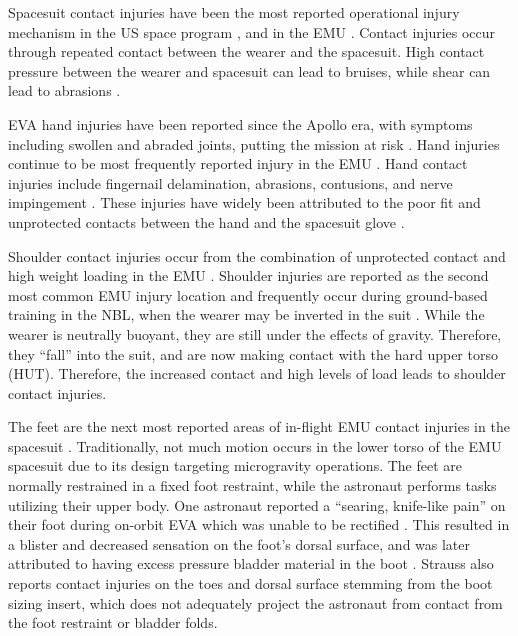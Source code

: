 \documentclass[defaultstyle,11pt]{comps}
\begin{document}
Spacesuit contact injuries have been the most reported operational injury mechanism in the US space program \citep{Scheuring2008}, and in the EMU \citep{Strauss2004, Viegas2004, Scheuring2012}.
Contact injuries occur through repeated contact between the wearer and the spacesuit.
High contact pressure between the wearer and spacesuit can lead to bruises, while shear can lead to abrasions \citep{Mailler2004, Carlson2006}.

EVA hand injuries have been reported since the Apollo era, with symptoms including swollen and abraded joints, putting the mission at risk \citep{Scheuring2012}.
Hand injuries continue to be most frequently reported injury in the EMU \citep{Strauss2004, Viegas2004, Scheuring2012}.
Hand contact injuries include fingernail delamination, abrasions, contusions, and nerve impingement \citep{Strauss2004, Viegas2004, Scheuring2012}.
These injuries have widely been attributed to the poor fit and unprotected contacts between the hand and the spacesuit glove \citep{Strauss2004, Viegas2004}.

Shoulder contact injuries occur from the combination of unprotected contact and high weight loading in the EMU \citep{Strauss2004, Viegas2004}.
Shoulder injuries are reported as the second most common EMU injury location and frequently occur during ground-based training in the NBL, when the wearer may be inverted in the suit \citep{Strauss2004, Viegas2004}.
While the wearer is neutrally buoyant, they are still under the effects of gravity.
Therefore, they ``fall'' into the suit, and are now making contact with the hard upper torso (HUT).
Therefore, the increased contact and high levels of load leads to shoulder contact injuries.

The feet are the next most reported areas of in-flight EMU contact injuries in the spacesuit \citep{Scheuring2012}.
Traditionally, not much motion occurs in the lower torso of the EMU spacesuit due to its design targeting microgravity operations.
The feet are normally restrained in a fixed foot restraint, while the astronaut performs tasks utilizing their upper body.
One astronaut reported a ``searing, knife-like pain'' on their foot during on-orbit EVA which was unable to be rectified \citep{Scheuring2012}.
This resulted in a blister and decreased sensation on the foot's dorsal surface, and was later attributed to having excess pressure bladder material in the boot \citep{Scheuring2012}.
Strauss \citep{Strauss2004} also reports contact injuries on the toes and dorsal surface stemming from the boot sizing insert, which does not adequately project the astronaut from contact from the foot restraint or bladder folds.
\end{document}
